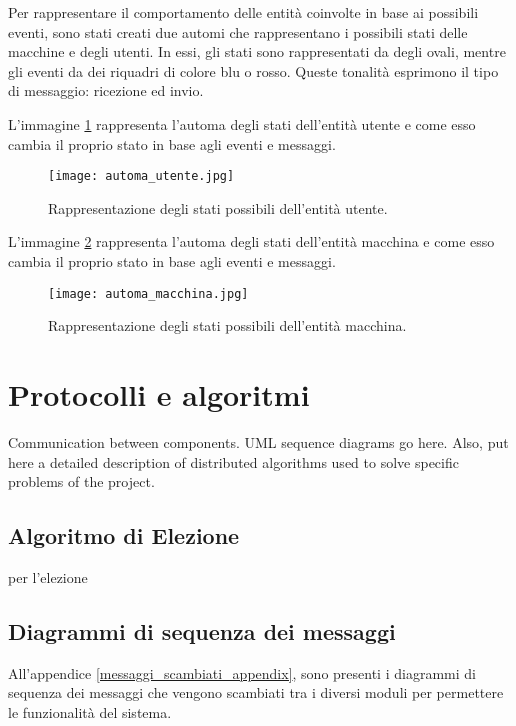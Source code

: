 Per rappresentare il comportamento delle entità coinvolte in base ai possibili eventi, sono stati creati due automi che rappresentano i possibili stati delle macchine e degli utenti. In essi, gli stati sono rappresentati da degli ovali, mentre gli eventi da dei riquadri di colore blu o rosso. Queste tonalità esprimono il tipo di messaggio: ricezione ed invio.

L'immagine \ref{fig:automa_utente} rappresenta l'automa degli stati dell'entità utente e come esso cambia il proprio stato in base agli eventi e messaggi.


\begin{figure}[htbp]
	\centering
	\texttt{[image: automa\_utente.jpg]}
	\caption{Rappresentazione degli stati possibili dell'entità utente.}
	\label{fig:automa_utente}
\end{figure}

L'immagine \ref{fig:automa_macchina} rappresenta l'automa degli stati dell'entità macchina e come esso cambia il proprio stato in base agli eventi e messaggi.


\begin{figure}[htbp]
	\centering
	\texttt{[image: automa\_macchina.jpg]}
	\caption{Rappresentazione degli stati possibili dell'entità macchina.}
	\label{fig:automa_macchina}
\end{figure}

\newpage

\section{Protocolli e algoritmi}
Communication between components. UML sequence diagrams go here. Also, put here a detailed description of distributed algorithms used to solve specific problems of the project.

\subsection{Algoritmo di Elezione}
per l'elezione

\subsection{Diagrammi di sequenza dei messaggi}
All'appendice \ref{messaggi_scambiati_appendix}, sono presenti i diagrammi di sequenza dei messaggi che vengono scambiati tra i diversi moduli per permettere le funzionalità del sistema.

